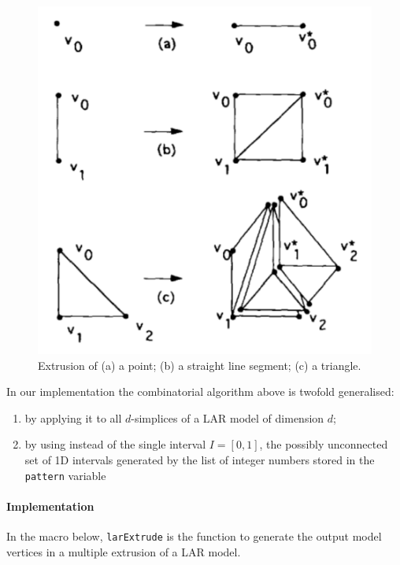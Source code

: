 \documentclass[11pt,oneside]{article}	%
\begin{document}
\begin{figure}[htbp] %
   \centering
   \begin{minipage}[c]{0.49\linewidth}
		\caption{Extrusion of (a) a point; (b) a straight line segment; (c) a triangle.}
	\end{minipage} 
   \begin{minipage}[c]{0.49\linewidth}
		\includegraphics[width=0.8\linewidth]{images/extrusion}
	\end{minipage} 
   \label{fig:extrusion}
\end{figure}

In our implementation the combinatorial algorithm above is twofold generalised:
\begin{enumerate}
\item by applying it to all $d$-simplices of a LAR model of dimension $d$;
\item by using instead of the single interval $I=[0,1]$, the possibly unconnected set of 1D intervals generated by the list of integer numbers stored in the \texttt{pattern} variable
\end{enumerate}

\paragraph{Implementation}
In the macro below, \texttt{larExtrude} is the function to generate the output model vertices in a multiple extrusion of a LAR model.
\end{document}
